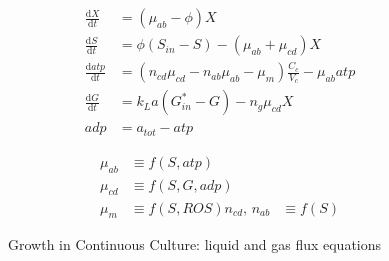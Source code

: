\documentclass[12pt,a4paper]{scrartcl}
\begin{document}
\begin{figure}
\begin{minipage}{.5\textwidth}
  \begin{equation*}
    \label{eqn:ancat}
    \begin{aligned}
      \frac{\text{d}X}{\text{d}t} &= (\mu_{ab} - \phi) X  \\
      \frac{\text{d}S}{\text{d}t} &= \phi (S_{in} - S)-(\mu_{ab} + \mu_{cd}) X\\  
      \frac{\text{d}atp}{\text{d}t} &= (n_{cd} \mu_{cd} - n_{ab} \mu_{ab} - \mu_{m})\frac{C_c}{V_c} - \mu_{ab} atp\\
      \frac{\text{d}G}{\text{d}t} &= k_La (G_{in}^* - G) - n_{g} \mu_{cd} X\\
      adp & = a_{tot} - atp
    \end{aligned}
  \end{equation*}
\end{minipage}
\begin{minipage}{.5\textwidth}
  \begin{equation*}
    \begin{aligned}
      \mu_{ab} &\equiv f(S,atp)\\
      \mu_{cd} &\equiv f(S,G,adp)\\
      \mu_m &\equiv f(S,ROS)
      n_{cd},\,n_{ab} &\equiv f(S) 
    \end{aligned}
  \end{equation*}
\end{minipage}
\caption{Growth in Continuous Culture: liquid and gas flux equations} 
\end{figure}
\end{document}
